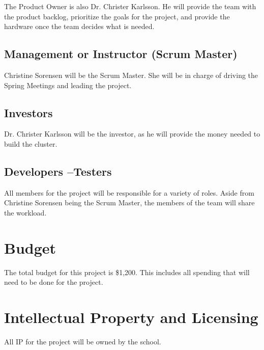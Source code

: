 The Product Owner is also Dr. Christer Karlsson. He will provide the team with the product backlog, prioritize the goals for the project, and provide the hardware once the team decides what is needed. 

\subsection{Management or Instructor (Scrum Master)}

Christine Sorensen will be the Scrum Master. She will be in charge of driving the Spring Meetings and leading the project.

\subsection{Investors}

Dr. Christer Karlsson will be the investor, as he will provide the money needed to build the cluster.

\subsection{Developers --Testers}

All members for the project will be responsible for a variety of roles. Aside from Christine Sorensen being the Scrum Master, the members of the team will share the workload.

\section{Budget}

The total budget for this project is \$1,200. This includes all spending that will need to be done for the project. 

\section{Intellectual Property and Licensing}

All IP for the project will be owned by the school.

